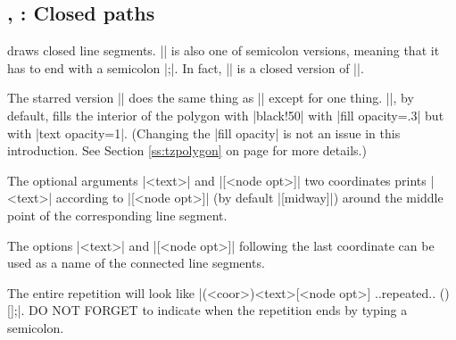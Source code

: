 \subsection{\protect\cmd{\tzpolygon}, \protect\cmd{\tzpolygon*}: Closed paths}
\label{ssi:tzpolygon}

\icmd{\tzpolygon} draws closed line segments. |\tzpolygon| is also one of semicolon versions, meaning that it has to end with a semicolon |;|.
In fact, |\tzpolygon| is a closed version of |\tzlines|.

The starred version |\tzpolygon*| does the same thing as |\tzpolygon| except for one thing.
|\tzpolygon*|, by default, fills the interior of the polygon with |black!50| with |fill opacity=.3| but with |text opacity=1|. (Changing the |fill opacity| is not an issue in this introduction. See Section \ref{ss:tzpolygon} on page \pageref{ss:tzpolygon} for more details.) 

\begin{tzcode}{.3}
\end{tzcode}

The optional arguments |{<text>}| and |[<node opt>]|  two coordinates prints |<text>| according to |[<node opt>]| (by default |[midway]|) around the middle point of the corresponding line segment.

\begin{tzcode}{.3}
\end{tzcode}

The options |{<text>}| and |[<node opt>]| following the last coordinate can be used as a name of the connected line segments. 

The entire repetition will look like |(<coor>){<text>}[<node opt>] ..repeated.. (){}[];|.
DO NOT FORGET to indicate when the repetition ends by typing a semicolon.

\begin{tzcode}{.3}
\end{tzcode}

